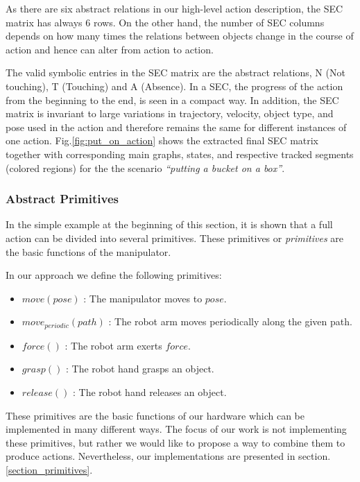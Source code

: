 As there are six abstract relations in our high-level action description, the SEC matrix has always $6$ rows.
On the other hand, the number of SEC columns depends on how many times the relations between objects change in the course of action and hence can alter from action to action.

The valid symbolic entries in the SEC matrix are the abstract relations, \ie N (Not touching), T (Touching) and A (Absence). In a SEC, the progress of the action from the beginning to the end, is seen in a compact way.
In addition, the SEC matrix is invariant to large variations in trajectory, velocity, object type, and pose used in the action and therefore remains the same for different instances of one action.
Fig.\ref{fig:put_on_action} shows the extracted final SEC matrix together with corresponding main graphs, \ie states, and respective tracked segments (colored regions) for the the scenario {\it ``putting a bucket on a box''}.



\clearpage  %
\subsubsection{Abstract Primitives}
\label{sec:abstract_primitives}
In the simple example at the beginning of this section, it is shown that a full action can be divided into several primitives.
These primitives or \textit{primitives} are the basic functions of the manipulator.

In our approach we define the following primitives:
\begin{itemize}
 \item $move(pose)$ :  The manipulator moves to $pose$.
 \item $move_{periodic}(path)$ : The robot arm moves periodically along the given path.
 \item $force()$ : The robot arm exerts $force$.
 \item $grasp()$ : The robot hand grasps an object.
 \item $release()$ : The robot hand releases an object.
\end{itemize}


These primitives are the basic functions of our hardware which can be implemented in many different ways.
The focus of our work is not implementing these primitives,
but rather we would like to propose a way to combine them to produce actions.
Nevertheless, our implementations are presented in section.\ref{section_primitives}.

